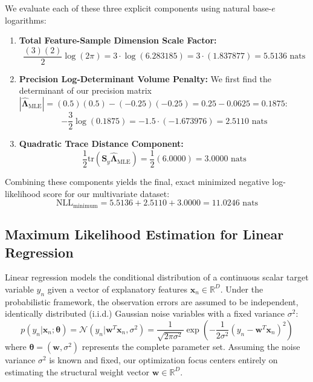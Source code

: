 \documentclass{article}
\begin{document}
We evaluate each of these three explicit components using natural base-$e$ logarithms:
\begin{enumerate}
    \item \textbf{Total Feature-Sample Dimension Scale Factor:}
    \begin{equation}
    \frac{(3)(2)}{2}\log(2\pi) = 3 \cdot \log(6.283185) = 3 \cdot (1.837877) = \mathbf{5.5136} \text{ nats}
    \end{equation}
    
    \item \textbf{Precision Log-Determinant Volume Penalty:}
    We first find the determinant of our precision matrix $|\hat{\boldsymbol{\Lambda}}_{\text{MLE}}| = (0.5)(0.5) - (-0.25)(-0.25) = 0.25 - 0.0625 = 0.1875$:
    \begin{equation}
    -\frac{3}{2}\log(0.1875) = -1.5 \cdot (-1.673976) = \mathbf{2.5110} \text{ nats}
    \end{equation}
    
    \item \textbf{Quadratic Trace Distance Component:}
    \begin{equation}
    \frac{1}{2}\text{tr}(\mathbf{S}_y \hat{\boldsymbol{\Lambda}}_{\text{MLE}}) = \frac{1}{2}(6.0000) = \mathbf{3.0000} \text{ nats}
    \end{equation}
\end{enumerate}

Combining these components yields the final, exact minimized negative log-likelihood score for our multivariate dataset:
\begin{equation}
\text{NLL}_{\text{minimum}} = 5.5136 + 2.5110 + 3.0000 = \mathbf{11.0246} \text{ nats}
\end{equation}

\subsection{Maximum Likelihood Estimation for Linear Regression}

Linear regression models the conditional distribution of a continuous scalar target variable $y_n$ given a vector of explanatory features $\mathbf{x}_n \in \mathbb{R}^D$. Under the probabilistic framework, the observation errors are assumed to be independent, identically distributed (i.i.d.) Gaussian noise variables with a fixed variance $\sigma^2$:
\begin{equation}
p(y_n | \mathbf{x}_n; \boldsymbol{\theta}) = \mathcal{N}(y_n | \mathbf{w}^T \mathbf{x}_n, \sigma^2) = \frac{1}{\sqrt{2\pi\sigma^2}} \exp\left( -\frac{1}{2\sigma^2} (y_n - \mathbf{w}^T \mathbf{x}_n)^2 \right)
\end{equation}
where $\boldsymbol{\theta} = (\mathbf{w}, \sigma^2)$ represents the complete parameter set. Assuming the noise variance $\sigma^2$ is known and fixed, our optimization focus centers entirely on estimating the structural weight vector $\mathbf{w} \in \mathbb{R}^D$.
\end{document}
